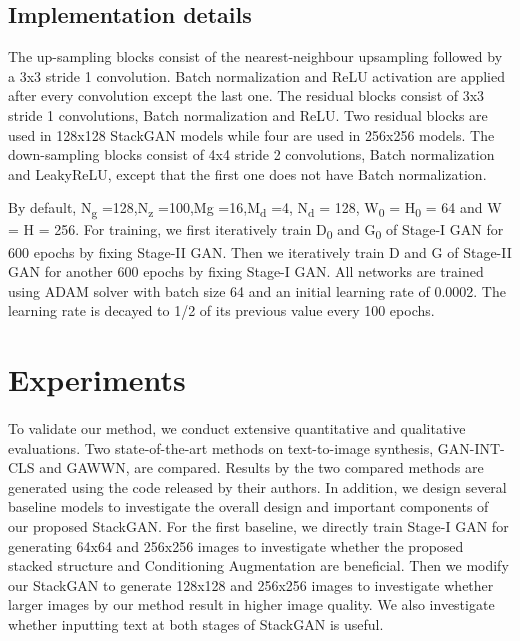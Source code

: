 \documentclass[a4paper,12pt,oneside]{article}
\begin{document}
\subsection{Implementation details}

The up-sampling blocks consist of the nearest-neighbour upsampling followed by a 3x3 stride 1 convolution. Batch normalization and ReLU activation are applied after every convolution except the last one. The residual blocks consist of 3x3 stride 1 convolutions, Batch normalization and ReLU. Two residual blocks are used in 128x128 StackGAN models while four are used in 256x256 models. The down-sampling blocks consist of 4x4 stride 2 convolutions, Batch normalization and LeakyReLU, except that the first one does not have Batch normalization. 

By default, N\textsubscript{g} =128,N\textsubscript{z} =100,Mg =16,M\textsubscript{d} =4, N\textsubscript{d} = 128, W\textsubscript{0} = H\textsubscript{0} = 64 and W = H = 256. For training, we first iteratively train D\textsubscript{0} and G\textsubscript{0} of Stage-I GAN for 600 epochs by fixing Stage-II GAN. Then we iteratively train D and G of Stage-II GAN for another 600 epochs by fixing Stage-I GAN. All networks are trained using ADAM solver with batch size 64 and an initial learning rate of 0.0002. The learning rate is decayed to 1/2 of its previous value every 100 epochs. 

\newpage
\section{Experiments}
\paragraph{}
To validate our method, we conduct extensive quantitative and qualitative evaluations. Two state-of-the-art methods on text-to-image synthesis, GAN-INT-CLS and GAWWN, are compared. Results by the two compared methods are generated using the code released by their authors. In addition, we design several baseline models to investigate the overall design and important components of our proposed StackGAN. For the first baseline, we directly train Stage-I GAN for generating 64x64 and 256x256 images to investigate whether the proposed stacked structure and Conditioning Augmentation are beneficial. Then we modify our StackGAN to generate 128x128 and 256x256 images to investigate whether larger images by our method result in higher image quality. We also investigate whether inputting text at both stages of StackGAN is useful. 
\end{document}
